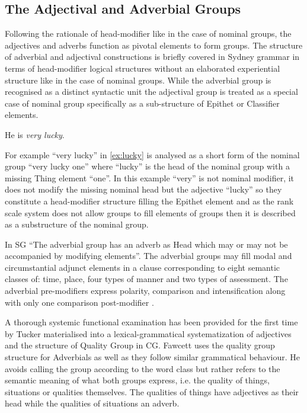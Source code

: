 	\subsection{The Adjectival and Adverbial Groups}
	\label{sec:advectival-adverbial-groups}
	Following the rationale of head-modifier like in the case of nominal groups, the adjectives and adverbs function as pivotal elements to form groups. The structure of adverbial and adjectival constructions is briefly covered in Sydney grammar in terms of head-modifier logical structures without an elaborated experiential structure like in the case of nominal groups. While the adverbial group is recognised as a distinct syntactic unit the adjectival group is treated as a special case of nominal group specifically as a sub-structure of Epithet or Classifier elements.
	
	\begin{exe}
		\ex\label{ex:lucky} He is \textit{very lucky}.
	\end{exe}
	
	For example ``very lucky'' in \ref{ex:lucky} is analysed as a short form of the nominal group ``very lucky one'' where ``lucky'' is the head of the nominal group with a missing Thing element ``one''. In this example ``very'' is not nominal modifier, it does not modify the missing nominal head but the adjective ``lucky'' so they constitute a head-modifier structure filling the Epithet element and as the rank scale system does not allow groups to fill elements of groups then it is described as a substructure of the nominal group.
	
	In SG ``The adverbial group has an adverb as Head which may or may not be accompanied by modifying elements''\citep[419]{Halliday2013}. The adverbial groups may fill modal and circumstantial adjunct elements in a clause corresponding to eight semantic classes of: time, place, four types of manner and two types of assessment. The adverbial pre-modifiers express polarity, comparison and intensification along with only one comparison post-modifier \citep[420-421]{Halliday2013}. 
	
	
	A thorough systemic functional examination has been provided for the first time by Tucker \citet{Tucker1997,Tucker1998} materialised into a lexical-grammatical systematization of adjectives and the structure of Quality Group in CG. Fawcett uses the quality group structure for Adverbials as well as they follow similar grammatical behaviour. He avoids calling the group according to the word class but rather refers to the semantic meaning of what both groups express, i.e. the quality of things, situations or qualities themselves. The qualities of things have adjectives as their head while the qualities of situations an adverb. 
	
